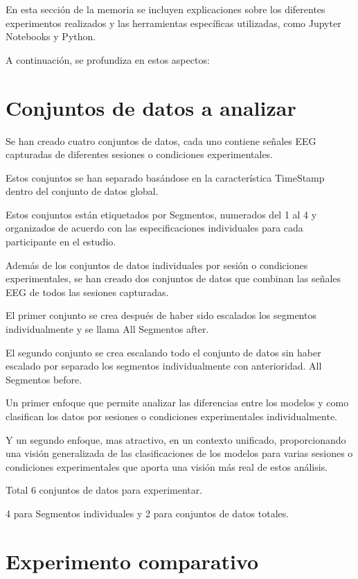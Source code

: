 

En esta sección de la memoria se incluyen explicaciones sobre los diferentes experimentos realizados y las herramientas específicas utilizadas, como Jupyter Notebooks y Python. 

A continuación, se profundiza en estos aspectos:


\section{Conjuntos de datos a analizar}

Se han creado cuatro conjuntos de datos, cada uno contiene señales EEG capturadas de diferentes sesiones o condiciones experimentales.

Estos conjuntos se han separado basándose en la característica TimeStamp dentro del conjunto de datos global.

Estos conjuntos están etiquetados por Segmentos, numerados del 1 al 4 y organizados de acuerdo con las especificaciones individuales para cada participante en el estudio.


Además de los conjuntos de datos individuales por sesión o condiciones experimentales, se han creado dos conjuntos de datos que combinan las señales EEG de todos las sesiones capturadas.

El primer conjunto se crea después de haber sido escalados los segmentos individualmente y se llama All Segmentos after.

El segundo conjunto se crea escalando todo el conjunto de datos sin haber escalado por separado los segmentos individualmente con anterioridad. All Segmentos before.


Un primer enfoque que permite analizar las diferencias entre los modelos y como clasifican los datos por sesiones o condiciones experimentales individualmente.

Y un segundo enfoque, mas atractivo, en un contexto unificado, proporcionando una visión generalizada de las clasificaciones de los modelos para varias sesiones o condiciones experimentales que aporta una visión más real de estos análisis.

Total 6 conjuntos de datos para experimentar. 

4 para Segmentos individuales y 2 para conjuntos de datos totales.


\section{Experimento comparativo}

